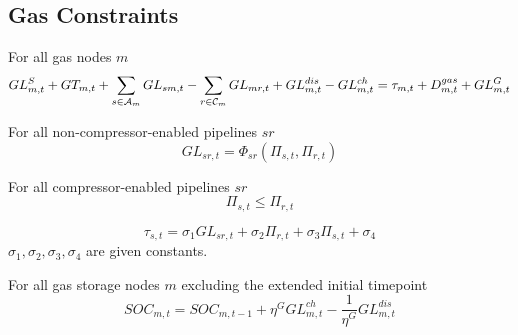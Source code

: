 \subsection{Gas Constraints}

For all gas nodes $m$ \atallt{}
\begin{equation}
  GL^S_{m,t} + GT_{m,t} + \sum_{s\in \mathcal A_m}{GL_{sm,t}} - \sum_{r\in
    \mathcal C_m}{GL_{mr,t}} + GL^{dis}_{m,t} - GL^{ch}_{m,t} = \tau_{m,t} +
  D^{gas}_{m,t} + GL^G_{m,t}
\end{equation}



For all non-compressor-enabled pipelines $sr$ \atallt{}
\begin{equation}
  GL_{sr,t} = \Phi_{sr}(\Pi_{s,t}, \Pi_{r,t})
\end{equation}



For all compressor-enabled pipelines $sr$ \atallt{}
\begin{equation}
  \Pi_{s,t} \leq \Pi_{r,t}
\end{equation}

\begin{equation}
  \tau_{s,t} = \sigma_1 GL_{sr,t} + \sigma_2 \Pi_{r,t} + \sigma_3 \Pi_{s,t} +
  \sigma_4
\end{equation}
$\sigma_1, \sigma_2, \sigma_3, \sigma_4$ are given constants.



For all gas storage nodes $m$ \atallextt{} excluding the extended initial
timepoint
\begin{equation}
  SOC_{m,t} = SOC_{m,t-1} + \eta^G GL^{ch}_{m,t} - \frac{1}{\eta^G}
  GL^{dis}_{m,t}
\end{equation}
